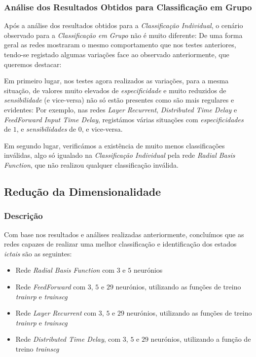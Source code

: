 \documentclass{article}
\begin{document}
\subsubsection{Análise dos Resultados Obtidos para Classificação em Grupo}

Após a análise dos resultados obtidos para a \emph{Classificação Individual}, o cenário observado para a \emph{Classificação em Grupo} não é muito diferente: De uma forma geral as redes mostraram o mesmo comportamento que nos testes anteriores, tendo-se registado algumas variações face ao observado anteriormente, que queremos destacar:

Em primeiro lugar, nos testes agora realizados as variações, para a mesma situação, de valores muito elevados de \emph{especificidade} e muito reduzidos de \emph{sensibilidade} (e vice-versa) não só estão presentes como são mais regulares e evidentes: Por exemplo, nas redes \emph{Layer Recurrent}, \emph{Distributed Time Delay} e \emph{FeedForward Input Time Delay}, registámos várias situações com \emph{especificidades} de $1$, e \emph{sensibilidades} de $0$, e vice-versa.

Em segundo lugar, verificámos a existência de muito menos classificações inválidas, algo só igualado na \emph{Classificação Individual} pela rede \emph{Radial Basis Function}, que não realizou qualquer classificação inválida.

\subsection{Redução da Dimensionalidade}

\subsubsection{Descrição}

Com base nos resultados e análises realizadas anteriormente, concluímos que as redes capazes de realizar uma melhor classificação e identificação dos estados \emph{ictais} são as seguintes:

\begin{itemize}
\item Rede \emph{Radial Basis Function} com $3$ e $5$ neurónios

\item Rede \emph{FeedForward} com $3$, $5$ e $29$ neurónios, utilizando as funções de treino \emph{trainrp} e \emph{trainscg}

\item Rede \emph{Layer Recurrent} com $3$, $5$ e $29$ neurónios, utilizando as funções de treino \emph{trainrp} e \emph{trainscg}

\item Rede \emph{Distributed Time Delay}, com $3$, $5$ e $29$ neurónios, utilizando a função de treino \emph{trainscg}
\end{itemize}
\end{document}
